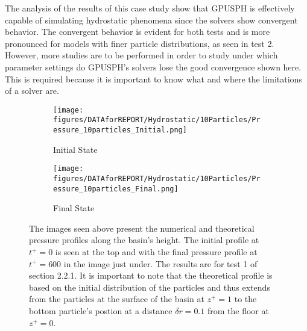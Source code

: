 \documentclass{../GPUSPHtemplate}
\begin{document}
The analysis of the results of this case study show that GPUSPH is effectively capable of simulating
hydrostatic phenomena since the solvers show convergent behavior. The convergent behavior is evident
for both tests and is more pronounced for models with finer particle distributions, as seen in test 2.
However, more studies are to be performed in order to study under which parameter settings do
GPUSPH's solvers lose the good convergence shown here. This is required because it is important
to know what and where the limitations of a solver are. 
\vfill
  

\begin{figure}[H]
             
  \begin{subfigure}{.9\textwidth}
    \centering
    \texttt{[image: figures/DATAforREPORT/Hydrostatic/10Particles/Pressure\_10particles\_Initial.png]}
    \vspace*{5pt}
    \caption{Initial State}
  \end{subfigure}%
  
  \begin{subfigure}{.9\textwidth}
    \centering 
    \texttt{[image: figures/DATAforREPORT/Hydrostatic/10Particles/Pressure\_10particles\_Final.png]}
    \caption{Final State}
  \end{subfigure}
  
  \caption{The images seen above present the numerical and theoretical pressure profiles along the basin's height. The initial profile at $t^+=0$ is seen at the top and with the final pressure profile at $t^+=600$ in the image just under. The results are for test 1 of section 2.2.1. It is important to note that the theoretical profile is based on the initial distribution of the particles and thus extends from the particles at the surface of the basin at $z^+=1$ to the bottom particle's postion at a distance $\delta r = 0.1 $ from the floor at $z^+=0$. }
  \label{fig:HydroExp1}
\end{figure}
\end{document}
